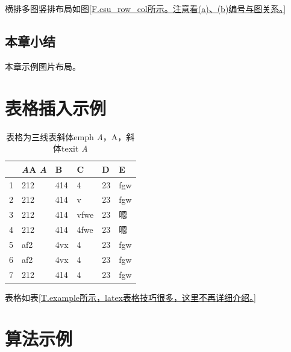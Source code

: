 横排多图竖排布局如图\ref{F.csu_row_col所示。注意看(a)、(b)编号与图关系。}

\subsection{本章小结}
本章示例图片布局。

\clearpage

\section{表格插入示例}

\begin{table}[htb]
  \centering
  \caption{表格为三线表斜体emph \emph{A}，A，斜体texit \textit{A}}
  \label{T.example}
  \begin{tabular}{llllll}
  \toprule
    & \emph{A}A \textit{A}  & B  & C  & D  & E \\
  \midrule
1 	& 212 & 414 & 4 		& 23 & fgw	\\
2 	& 212 & 414 & v 		& 23 & fgw	\\
3 	& 212 & 414 & vfwe		& 23 & 嗯	\\
4 	& 212 & 414 & 4fwe		& 23 & 嗯	\\
5 	& af2 & 4vx & 4 		& 23 & fgw	\\
6 	& af2 & 4vx & 4 		& 23 & fgw	\\
7 	& 212 & 414 & 4 		& 23 & fgw	\\
\bottomrule

\end{tabular}
\end{table}

表格如表\ref{T.example所示，latex表格技巧很多，这里不再详细介绍。}

\clearpage

\section{算法示例}

